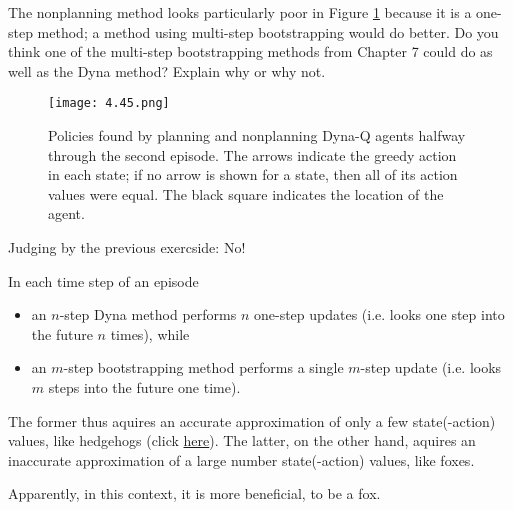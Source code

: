 
\begin{exercise}[Exercise 8.1]

The nonplanning method looks particularly poor in Figure \ref{fig:8.3} because it is a one-step method;
a method using multi-step bootstrapping would do better.
Do you think one of the multi-step bootstrapping methods from Chapter 7 could do as well as the Dyna method?
Explain why or why not.

\setcounter{section}{8}
\setcounter{figure}{2}

\begin{figure}[H]
    \centering
    \texttt{[image: 4.45.png]}
    \caption
    {
        Policies found by planning and nonplanning Dyna-Q agents halfway through the second episode.
        The arrows indicate the greedy action in each state;
        if no arrow is shown for a state, then all of its action values were equal.
        The black square indicates the location of the agent.
    }
    \label{fig:8.3}
\end{figure}

\end{exercise}


\begin{solution}

Judging by the previous exercside: No!

In each time step of an episode

\begin{itemize}
    \item an $n$-step Dyna method performs $n$ one-step updates (i.e. looks one step into the future $n$ times), while
    \item an $m$-step bootstrapping method performs a single $m$-step update (i.e. looks $m$ steps into the future one time).
\end{itemize}

The former thus aquires an accurate approximation of only a few state(-action) values, like hedgehogs (click \href{https://mathwithbaddrawings.com/2019/10/30/the-fox-hedgehog-game/}{here}).
The latter, on the other hand, aquires an inaccurate approximation of a large number state(-action) values, like foxes.

Apparently, in this context, it is more beneficial, to be a fox.

\end{solution}

